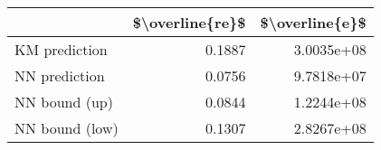 \begin{tabular}{lrr}
\toprule
{} &  \$\textbackslash overline\{re\}\$ &  \$\textbackslash overline\{e\}\$ \\
\midrule
KM prediction  &           0.1887 &      3.0035e+08 \\
NN prediction  &           0.0756 &      9.7818e+07 \\
NN bound (up)  &           0.0844 &      1.2244e+08 \\
NN bound (low) &           0.1307 &      2.8267e+08 \\
\bottomrule
\end{tabular}
